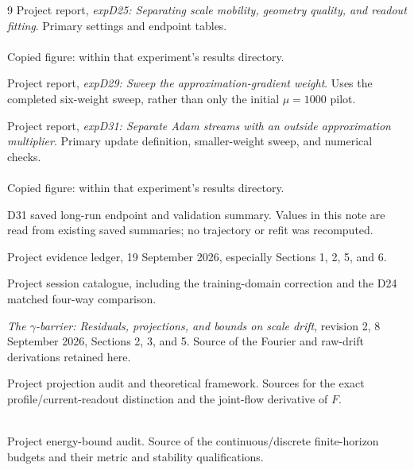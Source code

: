\documentclass[11pt]{article}
\begin{document}
\begin{thebibliography}{9}
\small
{}
Project report, \emph{expD25: Separating scale mobility, geometry quality, and readout fitting}. Primary settings and endpoint tables.\\
\\
Copied figure:  within that experiment's results directory.

Project report, \emph{expD29: Sweep the approximation-gradient weight}. Uses the completed six-weight sweep, rather than only the initial $\mu=1000$ pilot.\\

Project report, \emph{expD31: Separate Adam streams with an outside approximation multiplier}. Primary update definition, smaller-weight sweep, and numerical checks.\\
\\
Copied figure:  within that experiment's results directory.

D31 saved long-run endpoint and validation summary. Values in this note are read from existing saved summaries; no trajectory or refit was recomputed.\\

Project evidence ledger, 19 September 2026, especially Sections 1, 2, 5, and 6.\\

Project session catalogue, including the training-domain correction and the D24 matched four-way comparison.\\

\emph{The $\gamma$-barrier: Residuals, projections, and bounds on scale drift}, revision 2, 8 September 2026, Sections 2, 3, and 5. Source of the Fourier and raw-drift derivations retained here.\\

Project projection audit and theoretical framework. Sources for the exact profile/current-readout distinction and the joint-flow derivative of $F$.\\
\\

Project energy-bound audit. Source of the continuous/discrete finite-horizon budgets and their metric and stability qualifications.\\
\end{thebibliography}
\end{document}
